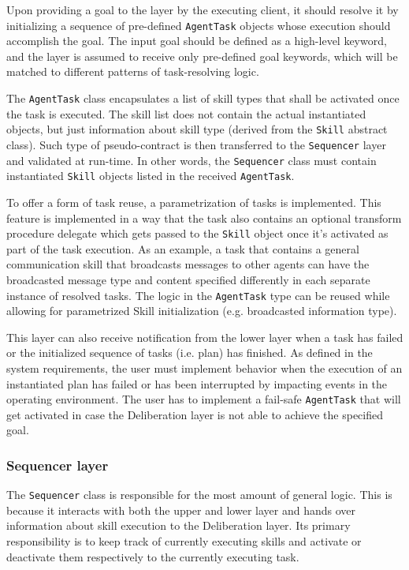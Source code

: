 \documentclass[0main.tex]{subfiles}
\begin{document}
Upon providing a goal to the layer by the executing client, it should resolve it by
initializing a sequence of pre-defined \texttt{AgentTask} objects whose execution should 
accomplish the goal. The input goal should be defined 
as a high-level keyword, and the layer is assumed to receive only pre-defined goal keywords,
which will be matched to different patterns of task-resolving logic.

The \texttt{AgentTask} class encapsulates a list of skill types that shall be activated 
once the task is executed. The skill list does not contain the actual instantiated 
objects, but just information about skill type (derived from the \texttt{Skill} abstract 
class). Such type of pseudo-contract is then transferred to the \texttt{Sequencer} layer and 
validated at run-time. In other words, the \texttt{Sequencer} class must contain instantiated
\texttt{Skill} objects listed in the received \texttt{AgentTask}.

To offer a form of task reuse, a parametrization of tasks is implemented. This feature is 
implemented in a way that the task also contains an optional transform procedure delegate which 
gets passed to the \texttt{Skill} object once it's activated as part of the task execution.
As an example, a task that contains a general communication skill that broadcasts messages to
other agents can have the broadcasted message type and content specified differently in each 
separate instance of resolved tasks. The logic in the \texttt{AgentTask} type can be reused 
while allowing for parametrized Skill initialization (e.g. broadcasted information type). 

This layer can also receive notification from the lower layer when a task has failed or 
the initialized sequence of tasks (i.e. plan) has finished. As defined in the system requirements, 
the user must implement behavior when the execution of an instantiated plan has failed or 
has been interrupted by impacting events in the operating environment. The user has to implement 
a fail-safe \texttt{AgentTask} that will get activated in case the Deliberation layer is not able 
to achieve the specified goal. 

\subsubsection{Sequencer layer}

The \texttt{Sequencer} class is responsible for the most amount of general logic. This is because 
it interacts with both the upper and lower layer and hands over information about skill execution 
to the Deliberation layer. Its primary responsibility is to keep track of currently executing skills 
and activate or deactivate them respectively to the currently executing task. 
\end{document}
